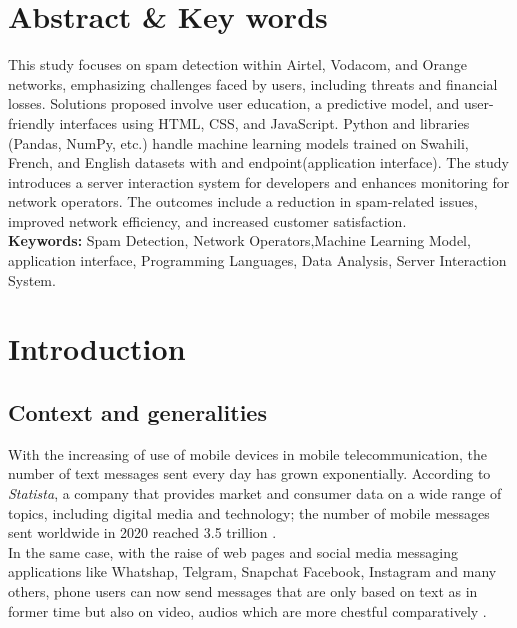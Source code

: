 \documentclass[12pt,a4paper, oneside]{book}
\begin{document}
\listoftables 
	
	\chapter{Abstract \& Key words} 
	This study focuses on spam detection within Airtel, Vodacom, and Orange networks, emphasizing challenges faced by users, including threats and financial losses. Solutions proposed involve user education, a predictive model, and user-friendly interfaces using HTML, CSS, and JavaScript. Python and libraries (Pandas, NumPy, etc.) handle machine learning models trained on Swahili, French, and English datasets with and endpoint(application interface). The study introduces a server interaction system for developers and enhances monitoring for network operators. The outcomes include a reduction in spam-related issues, improved network efficiency, and increased customer satisfaction.\\
		
	\textbf{Keywords:}
	Spam Detection, Network Operators,Machine Learning Model, application interface, Programming Languages, Data Analysis, Server Interaction System.
	
	\mainmatter

	\chapter*{Introduction}  
	\pagestyle{plain}
	\section{Context and generalities} 
	With the increasing of use of mobile devices in mobile telecommunication, the number of text messages sent every day has grown exponentially. According to \textit{Statista}, a company that provides market and consumer data on a wide range of topics, including digital media and technology; the number of mobile messages sent worldwide in 2020 reached 3.5 trillion \citep{Statista2020}. \\
	
	In the same case, with the raise of web pages and social media messaging applications like Whatshap, Telgram, Snapchat Facebook, Instagram and many others, phone users can now send messages  that are only based on text as in former time but also on video, audios which are more chestful comparatively \citep{faklaris2016oh}. \\
	
\end{document}
